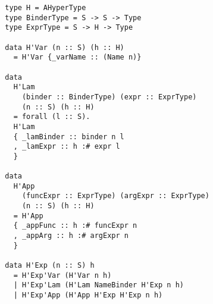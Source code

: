 
\begin{verbatim}
  type H = AHyperType
  type BinderType = S -> S -> Type
  type ExprType = S -> H -> Type
  
  data H'Var (n :: S) (h :: H)
    = H'Var {_varName :: (Name n)}
  
  data
    H'Lam
      (binder :: BinderType) (expr :: ExprType)
      (n :: S) (h :: H)
    = forall (l :: S).
    H'Lam
    { _lamBinder :: binder n l
    , _lamExpr :: h :# expr l
    }
  
  data
    H'App
      (funcExpr :: ExprType) (argExpr :: ExprType)
      (n :: S) (h :: H)
    = H'App
    { _appFunc :: h :# funcExpr n
    , _appArg :: h :# argExpr n
    }
  
  data H'Exp (n :: S) h
    = H'Exp'Var (H'Var n h)
    | H'Exp'Lam (H'Lam NameBinder H'Exp n h)
    | H'Exp'App (H'App H'Exp H'Exp n h)
\end{verbatim}



